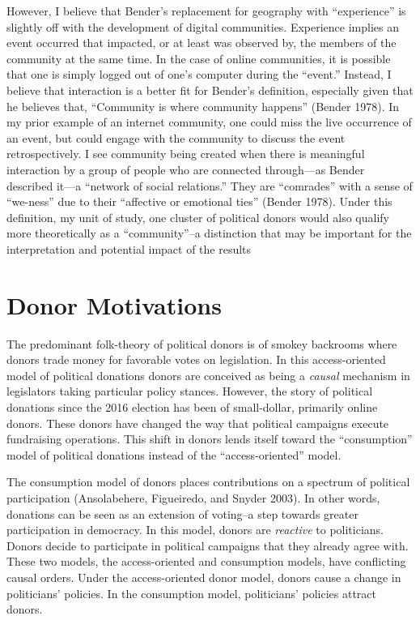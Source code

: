 \documentclass[12pt,]{article}
\begin{document}
However, I believe that Bender's replacement for geography with
``experience'' is slightly off with the development of digital
communities. Experience implies an event occurred that impacted, or at
least was observed by, the members of the community at the same time. In
the case of online communities, it is possible that one is simply logged
out of one's computer during the ``event.'' Instead, I believe that
interaction is a better fit for Bender's definition, especially given
that he believes that, ``Community is where community happens'' (Bender
1978). In my prior example of an internet community, one could miss the
live occurrence of an event, but could engage with the community to
discuss the event retrospectively. I see community being created when
there is meaningful interaction by a group of people who are connected
through---as Bender described it---a ``network of social relations.''
They are ``comrades'' with a sense of ``we-ness'' due to their
``affective or emotional ties'' (Bender 1978). Under this definition, my
unit of study, one cluster of political donors would also qualify more
theoretically as a ``community''--a distinction that may be important
for the interpretation and potential impact of the results

\hypertarget{donor-motivations}{%
\section{Donor Motivations}\label{donor-motivations}}

The predominant folk-theory of political donors is of smokey backrooms
where donors trade money for favorable votes on legislation. In this
access-oriented model of political donations donors are conceived as
being a \emph{causal} mechanism in legislators taking particular policy
stances. However, the story of political donations since the 2016
election has been of small-dollar, primarily online donors. These donors
have changed the way that political campaigns execute fundraising
operations. This shift in donors lends itself toward the ``consumption''
model of political donations instead of the ``access-oriented'' model.

The consumption model of donors places contributions on a spectrum of
political participation (Ansolabehere, Figueiredo, and Snyder 2003). In
other words, donations can be seen as an extension of voting--a step
towards greater participation in democracy. In this model, donors are
\emph{reactive} to politicians. Donors decide to participate in
political campaigns that they already agree with. These two models, the
access-oriented and consumption models, have conflicting causal orders.
Under the access-oriented donor model, donors cause a change in
politicians' policies. In the consumption model, politicians' policies
attract donors.
\end{document}
